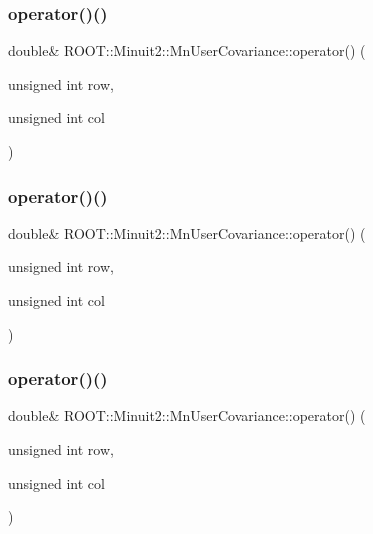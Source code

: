 \subsubsection{\texorpdfstring{operator()()}{operator()()}\hspace{0.1cm}{\footnotesize\ttfamily [4/6]}}
{\footnotesize\ttfamily double\& R\+O\+O\+T\+::\+Minuit2\+::\+Mn\+User\+Covariance\+::operator() (\begin{DoxyParamCaption}\item[{unsigned int}]{row,  }\item[{unsigned int}]{col }\end{DoxyParamCaption})\hspace{0.3cm}{\ttfamily [inline]}}

\mbox{\label{classROOT_1_1Minuit2_1_1MnUserCovariance_af63a82e8fc0c72cdb46fe670da78ffce}} 
\subsubsection{\texorpdfstring{operator()()}{operator()()}\hspace{0.1cm}{\footnotesize\ttfamily [5/6]}}
{\footnotesize\ttfamily double\& R\+O\+O\+T\+::\+Minuit2\+::\+Mn\+User\+Covariance\+::operator() (\begin{DoxyParamCaption}\item[{unsigned int}]{row,  }\item[{unsigned int}]{col }\end{DoxyParamCaption})\hspace{0.3cm}{\ttfamily [inline]}}

\mbox{\label{classROOT_1_1Minuit2_1_1MnUserCovariance_af63a82e8fc0c72cdb46fe670da78ffce}} 
\subsubsection{\texorpdfstring{operator()()}{operator()()}\hspace{0.1cm}{\footnotesize\ttfamily [6/6]}}
{\footnotesize\ttfamily double\& R\+O\+O\+T\+::\+Minuit2\+::\+Mn\+User\+Covariance\+::operator() (\begin{DoxyParamCaption}\item[{unsigned int}]{row,  }\item[{unsigned int}]{col }\end{DoxyParamCaption})\hspace{0.3cm}{\ttfamily [inline]}}


